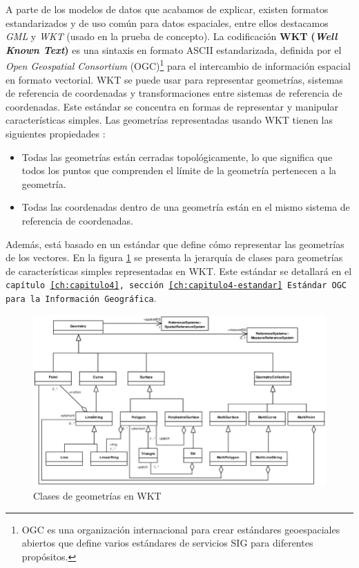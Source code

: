 
A parte de los modelos de datos que acabamos de explicar, existen formatos estandarizados y de uso común para datos espaciales, entre ellos destacamos \textit{GML} y \textit{WKT} (usado en la prueba de concepto). La codificación \textbf{WKT} \textbf{(\textit{Well Known Text})} es una sintaxis en formato ASCII estandarizada, definida por el \textit{Open Geospatial Consortium} (OGC)\footnote{OGC es una organización internacional para crear estándares geoespaciales abiertos que define varios estándares de servicios SIG para diferentes propósitos.} para el intercambio de información espacial en formato vectorial. WKT se puede usar para representar geometrías, sistemas de referencia de coordenadas y transformaciones entre sistemas de referencia de coordenadas. Este estándar se concentra en formas de representar y manipular características simples. Las geometrías representadas usando WKT tienen las siguientes propiedades \cite{wkt-database}:

\begin{itemize}
	\item Todas las geometrías están cerradas topológicamente, lo que significa que todos los puntos que comprenden el límite de la geometría pertenecen a la geometría.
	
	\item Todas las coordenadas dentro de una geometría están en el mismo sistema de referencia de coordenadas.
\end{itemize} 

Además, está basado en un estándar que define cómo representar las geometrías de los vectores. En la figura \ref{fig:the-classes-of-geometries-in-wkt-figure-from-4} se presenta la jerarquía de clases para geometrías de características simples representadas en WKT.  Este estándar se detallará en el \texttt{capítulo \ref{ch:capitulo4}, sección \ref{ch:capitulo4-estandar} Estándar OGC para la Información Geográfica}.

\begin{figure}[H]
	\centering
	\includegraphics[width=0.9\linewidth]{imagenes/capitulo2/The-classes-of-geometries-in-WKT-figure-from-4}
	\caption{Clases de geometrías en WKT \cite{wkt-database}}
	\label{fig:the-classes-of-geometries-in-wkt-figure-from-4}
\end{figure}

